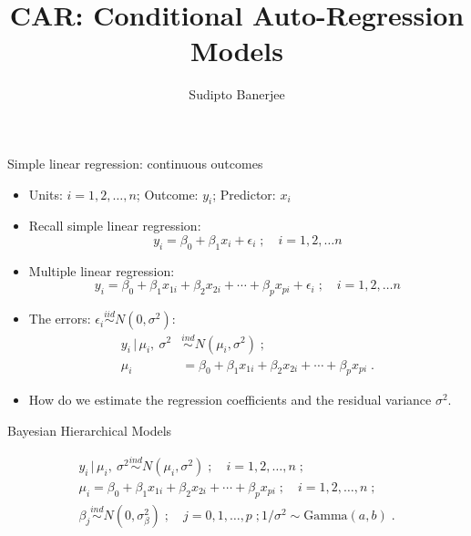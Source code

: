 \documentclass[10pt]{beamer}
\title[BIOSTAT~241] 
{%
CAR: Conditional Auto-Regression Models
}
\author[Sudipto Banerjee]
{
 Sudipto Banerjee
}
\institute[UCLA]
{
  University of California, Los Angeles, USA
}
\date[]{}
\newcommand{\given}{\, | \,}
\begin{document}
\begin{frame}
 \titlepage
\end{frame}

\begin{frame}{Simple linear regression: continuous outcomes}

\begin{itemize}
 \item Units: $i=1,2,\ldots,n$; Outcome: $y_i$; Predictor: $x_i$

 \item Recall simple linear regression:
\[
 y_i = \beta_0 + \beta_1 x_i + \epsilon_i\;;\quad i=1,2,\ldots n 
\]
 
 \item Multiple linear regression:
\[
 y_i = \beta_0 + \beta_1 x_{1i} + \beta_2 x_{2i} + \cdots + \beta_p x_{pi} + \epsilon_i\;;\quad i=1,2,\ldots n 
\] 

 \item The errors: $\epsilon_i \stackrel{iid}{\sim} N(0,\sigma^2)$:
 \begin{align*}
  y_i \given \mu_i,\: \sigma^2 &\stackrel{ind}{\sim} N(\mu_i, \sigma^2)\;; \\
  \mu_i &= \beta_0 + \beta_1 x_{1i} + \beta_2 x_{2i} + \cdots + \beta_p x_{pi}\;. 
 \end{align*}

 \item  How do we estimate the regression coefficients and the residual variance $\sigma^2$. 
\end{itemize}


\end{frame}

\begin{frame}{Bayesian Hierarchical Models}
 
 \begin{multline*}
  y_i \given \mu_i,\: \sigma^2 \stackrel{ind}{\sim} N(\mu_i, \sigma^2)\;;\quad i=1,2,\ldots,n\;; \\
  \mu_i = \beta_0 + \beta_1 x_{1i} + \beta_2 x_{2i} + \cdots + \beta_p x_{pi}\;;\quad i=1,2,\ldots,n\;; \\
  \beta_j \stackrel{ind}{\sim} N(0, \sigma^2_{\beta})\;;\quad j=0,1,\ldots,p\;; 1/\sigma^2 \sim \mbox{Gamma}(a,b)\;. 
 \end{multline*}
 
\end{frame}
\end{document}

